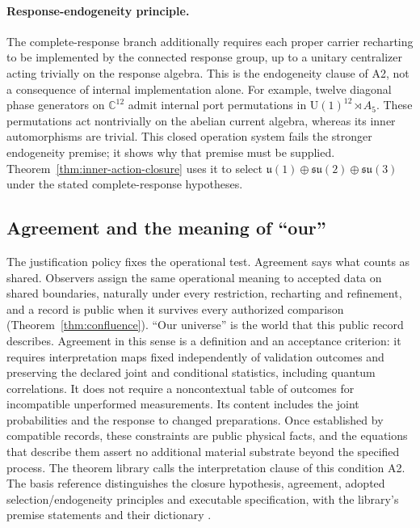 \documentclass[11pt]{article}
\theoremstyle{definition}
\theoremstyle{remark}
\begin{document}
\paragraph{Response-endogeneity principle.} The complete-response branch
additionally requires each proper carrier recharting to be implemented by
the connected response group, up to a unitary centralizer acting trivially
on the response algebra. This is the endogeneity clause of A2, not a
consequence of internal implementation alone. For example, twelve diagonal
phase generators on $\mathbb C^{12}$ admit internal port permutations in
$\mathrm U(1)^{12}\rtimes A_5$. These permutations act nontrivially on the
abelian current algebra, whereas its inner automorphisms are trivial. This
closed operation system fails the stronger endogeneity premise; it shows
why that premise must be supplied. Theorem~\ref{thm:inner-action-closure}
uses it to select $\mathfrak u(1)\oplus\mathfrak{su}(2)\oplus\mathfrak{su}(3)$
under the stated complete-response hypotheses.

\subsection{Agreement and the meaning of ``our''}

The justification policy fixes the operational test. Agreement says what
counts as shared. Observers assign the same operational meaning to accepted
data on shared boundaries, naturally under every restriction, recharting and
refinement, and a record is public when it survives every authorized
comparison (Theorem~\ref{thm:confluence}). ``Our universe'' is the world
that this public record describes. Agreement in this sense is a definition
and an acceptance criterion: it requires interpretation maps fixed independently
of validation outcomes and preserving the declared joint and conditional
statistics, including quantum correlations. It does not require a
noncontextual table of outcomes for incompatible unperformed measurements.
Its content includes the joint probabilities and the response to changed
preparations. Once established by compatible records, these constraints
are public physical facts, and the equations that describe them assert no
additional material substrate beyond the specified process.
The theorem library calls the interpretation clause of this condition A2.
The basis reference distinguishes the closure hypothesis, agreement,
adopted selection/endogeneity principles and executable specification, with
the library's premise statements and their dictionary \cite{ophbasis}.
\end{document}
